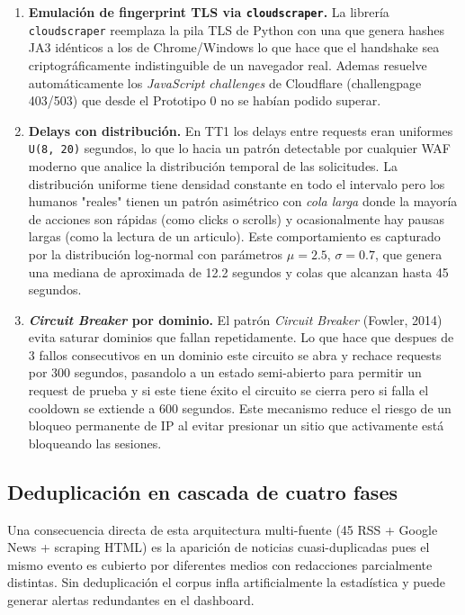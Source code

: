 \begin{enumerate}
    \item \textbf{Emulación de fingerprint TLS via \texttt{cloudscraper}.}
          La librería \texttt{cloudscraper} reemplaza la pila TLS de Python con una
          que genera hashes JA3 idénticos a los de Chrome/Windows lo que hace que el
          handshake sea criptográficamente indistinguible de un navegador real. Ademas
          resuelve automáticamente los \textit{JavaScript challenges} de Cloudflare
          (challeng\-page 403/503) que desde el Prototipo 0 no se habían podido superar.

    \item \textbf{Delays con distribución.}
          En TT1 los delays entre requests eran uniformes \texttt{U(8, 20)} segundos, lo que
          lo hacia un patrón detectable por cualquier WAF moderno que analice la distribución
          temporal de las solicitudes. La distribución uniforme tiene densidad constante en todo el
          intervalo pero los humanos "reales" tienen un patrón asimétrico con \textit{cola larga} donde
          la mayoría de acciones son rápidas (como clicks o scrolls) y ocasionalmente hay pausas
          largas (como la lectura de un articulo). Este comportamiento es capturado por la distribución
          log-normal con parámetros $\mu=2.5$, $\sigma=0.7$, que genera una mediana de
          aproximada de 12.2 segundos y colas que alcanzan hasta 45 segundos.

    \item \textbf{\textit{Circuit Breaker} por dominio.}
          El patrón \textit{Circuit Breaker} (Fowler, 2014) evita saturar dominios
          que fallan repetidamente. Lo que hace que despues de 3 fallos consecutivos en un dominio
          este circuito se abra y rechace requests por 300 segundos, pasandolo a un estado
          semi-abierto para permitir un request de prueba y si este tiene éxito el circuito se cierra pero 
          si falla el cooldown se extiende a 600 segundos. Este mecanismo reduce el riesgo de un bloqueo
          permanente de IP al evitar presionar un sitio que activamente está bloqueando las sesiones.
\end{enumerate}
 
\subsection{Deduplicación en cascada de cuatro fases}
\label{subsec:tt2_dedup}

Una consecuencia directa de esta arquitectura multi-fuente (45 RSS + Google News +
scraping HTML) es la aparición de noticias cuasi-duplicadas pues el mismo evento es cubierto
por diferentes medios con redacciones parcialmente distintas. Sin deduplicación
el corpus infla artificialmente la estadística y puede generar alertas redundantes
en el dashboard.

